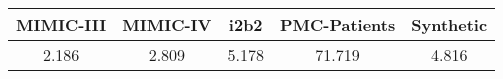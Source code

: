 \begin{tabular}{c|c|c|c|c}
\textbf{MIMIC-III} & \textbf{MIMIC-IV} & \textbf{i2b2} & \textbf{PMC-Patients} & \textbf{Synthetic} \\ \hline
2.186              & 2.809             & 5.178         & 71.719                & 4.816        
\end{tabular}